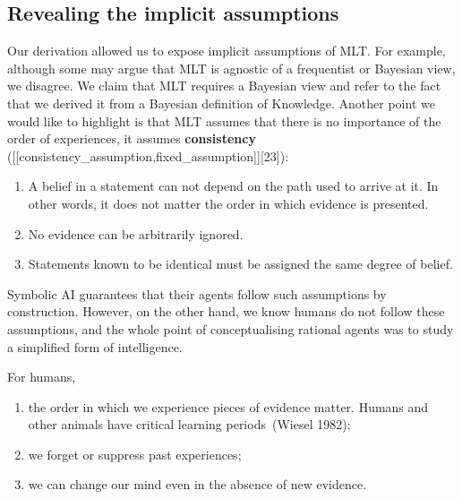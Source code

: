\documentclass[
  letterpaper,
  12pt,
  british]{tufte-book}
\theoremstyle{plain}
\theoremstyle{definition}
\theoremstyle{plain}
\theoremstyle{remark}
\begin{document}
\hypertarget{revealing-the-implicit-assumptions}{%
\subsection{Revealing the implicit
assumptions}\label{revealing-the-implicit-assumptions}}

Our derivation allowed us to expose implicit assumptions of {MLT}. For
example, although some may argue that {MLT} is agnostic of a frequentist
or Bayesian view, we disagree. We claim that {MLT} requires a Bayesian
view and refer to the fact that we derived it from a Bayesian definition
of Knowledge. Another point we would like to highlight is that {MLT}
assumes that there is no importance of the order of experiences, it
assumes \textbf{consistency}
({[}{[}consistency\_assumption,fixed\_assumption{]}{]}{[}23{]}):

\begin{enumerate}
\def\labelenumi{\roman{enumi}.}
\item
  A belief in a statement can not depend on the path used to arrive at
  it. In other words, it does not matter the order in which evidence is
  presented.
\item
  No evidence can be arbitrarily ignored.
\item
  Statements known to be identical must be assigned the same degree of
  belief.
\end{enumerate}

Symbolic AI guarantees that their agents follow such assumptions by
construction. However, on the other hand, we know humans do not follow
these assumptions, and the whole point of conceptualising rational
agents was to study a simplified form of intelligence.

For humans,

\begin{enumerate}
\def\labelenumi{\roman{enumi}.}
\item
  the order in which we experience pieces of evidence matter. Humans and
  other animals have critical learning periods~(Wiesel
  1982);
\item
  we forget or suppress past experiences;
\item
  we can change our mind even in the absence of new evidence.
\end{enumerate}
\end{document}
